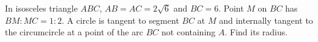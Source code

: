 In isosceles triangle $ABC$, $AB=AC=2\sqrt6$ and $BC=6$. Point $M$ on $BC$ has $BM:MC=1:2$. A circle is tangent to segment $BC$ at $M$ and internally tangent to the circumcircle at a point of the arc $BC$ not containing $A$. Find its radius.
